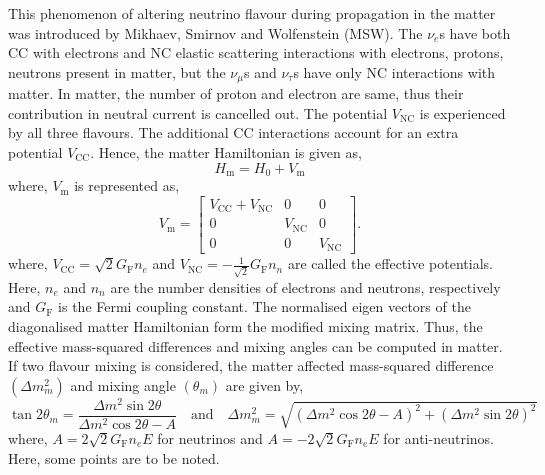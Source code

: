 This phenomenon of altering neutrino flavour during propagation in the
matter was introduced by Mikhaev, Smirnov and Wolfenstein
(MSW)\cite{msw1}. The $\nu_{e}$s have both CC with electrons and
NC elastic scattering interactions with electrons, protons, neutrons
present in matter, but the $\nu_{\mu}$s and $\nu_{\tau}$s have only NC
interactions with matter.
In matter, the number of proton and electron
are same, thus their contribution in neutral current is cancelled out.
The potential $V_{\textrm{NC}}$ is experienced by all three flavours.
The additional CC interactions account for an extra potential
$V_{\textrm{CC}}$. Hence, the matter Hamiltonian is given as,
\begin{equation}
  H_{\mathrm{m}} = H_{0}+V_{\mathrm{m}}
\end{equation}
where, $V_{\mathrm{m}}$ is represented as,
\begin{equation}
  V_{\mathrm{m}} =
  \begin{bmatrix}
    V_{\textrm{CC}} + V_{\textrm{NC}} & 0 & 0 \\
    0 & V_{\textrm{NC}} & 0 \\
    0 & 0 & V_{\textrm{NC}}
  \end{bmatrix}.
\end{equation}
where, $V_{\textrm{CC}} = \sqrt{2}G_{\mathrm{F}}n_{e}$ and
$V_{\textrm{NC}} = -\frac{1}{\sqrt{2}}G_{\mathrm{F}}n_{n}$ are called the
effective potentials. Here, $n_{e}$ and $n_{n}$ are the number densities
of electrons and neutrons, respectively and $G_{\mathrm{F}}$ is the
Fermi coupling constant.
The normalised eigen vectors of the diagonalised matter Hamiltonian
form the modified mixing matrix. Thus, the effective mass-squared
differences and mixing angles can be computed in matter. If two
flavour mixing is considered, the matter affected mass-squared
difference $\left(\Delta m^{2}_{m}\right)$ and
mixing angle $\left(\theta_{m}\right)$ are given by,
\begin{equation}
  \tan 2\theta_{m}=\frac{\Delta m^{2}\sin 2\theta}{\Delta m^{2}\cos 2\theta -A} \quad\text{and}\quad \Delta m^{2}_{m} = \sqrt{\left(\Delta m^{2}\cos 2\theta -A\right)^{2} + \left(\Delta m^{2}\sin 2\theta\right)^{2}} \label{eq:mattermass}
\end{equation}
where, $A=2\sqrt{2}G_{\mathrm{F}}n_{e}E$ for neutrinos and
$A=-2\sqrt{2}G_{\mathrm{F}}n_{e}E$ for anti-neutrinos. Here, some points are to
be noted.
